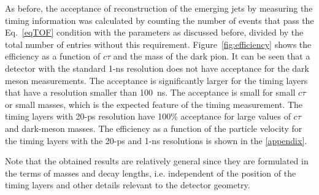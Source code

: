 As before, the acceptance of reconstruction of the emerging jets by measuring the timing information was calculated by 
counting the number of events that pass the 
Eq.~\ref{eqTOF} condition  with the parameters as discussed before, divided by the total number of entries
without this requirement. Figure~\ref{fig:efficiency} shows the efficiency
as a function of $c\tau$ and the mass of the dark pion. It can be seen that a detector with the standard 1-ns resolution does
not have acceptance for the dark meson measurements. The acceptance is significantly larger for the timing layers that have a resolution smaller than 100~ns.
The acceptance is small for small $c\tau$ or small masses, which is the expected feature of the timing measurement.
The timing layers with 20-ps resolution have 100\% acceptance for large values of $c\tau$ and dark-meson masses.
The efficiency as a function of the particle velocity for the timing layers with the 20-ps and 1-ns resolutions
is shown in the \ref{appendix}.

Note that the obtained results are relatively general since they are formulated in the terms of masses and decay lengths,  
i.e. independent of the position of the timing layers and other details relevant to 
the detector geometry.


